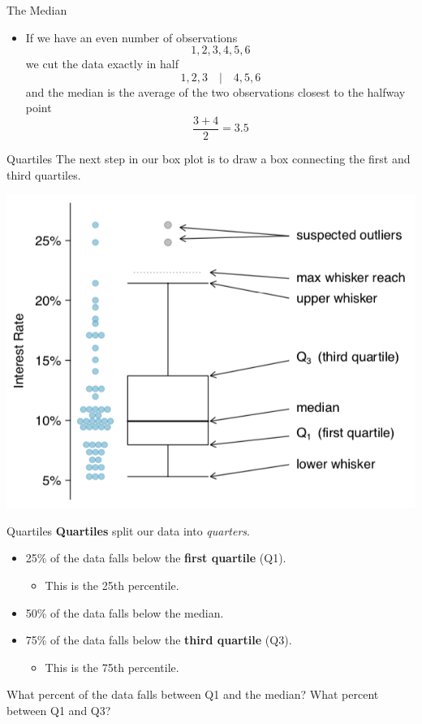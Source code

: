 \begin{frame}{The Median}
    \begin{itemize}
        \item If we have an even number of observations
        \[
        1,2,3,4,5,6
        \]
        we cut the data exactly in half
        \[
        1,2,3 \quad|\quad 4,5,6
        \]
        and the median is the average of the two observations closest to the halfway point
        \[
        \frac{3+4}{2}=3.5
        \]
    \end{itemize}
\end{frame}

\begin{frame}{Quartiles}
    The next step in our box plot is to draw a box connecting the first and third quartiles.
    
    \begin{center}
        \includegraphics[scale=0.35]{images/boxplot.png}
    \end{center}
\end{frame}

\begin{frame}{Quartiles}
    \textbf{Quartiles} split our data into \textit{quarters}.
    \begin{itemize}
        \item 25\% of the data falls below the \textbf{first quartile} (Q1). 
        \begin{itemize}
            \item This is the 25th percentile. 
        \end{itemize}
        \item 50\% of the data falls below the median.
        \item 75\% of the data falls below the \textbf{third quartile} (Q3). 
        \begin{itemize}
            \item This is the 75th percentile. 
        \end{itemize}
    \end{itemize}
    
    \vspace{12pt}What percent of the data falls between Q1 and the median? What percent between Q1 and Q3?
\end{frame}

